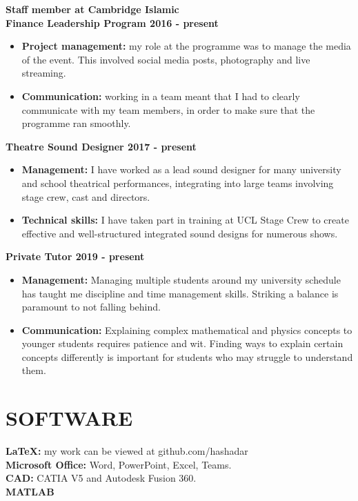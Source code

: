 \documentclass[margin, 10pt]{res} %
\begin{document}
\begin{resume}
\textbf{Staff member at Cambridge Islamic \\ Finance Leadership Program \hfill 2016 - present}
\\
\begin{itemize}
  \item \textbf{Project management:} my role at the programme was to manage the media of the event. This involved social media posts, photography and live streaming. 
  \item \textbf{Communication:} working in a team meant that I had to clearly communicate with my team members, in order to make sure that the programme ran smoothly.
\end{itemize}

\textbf{Theatre Sound Designer \hfill 2017 - present}
\\
\begin{itemize}
  \item \textbf{Management:} I have worked as a lead sound designer for many university and school theatrical performances, integrating into large teams involving stage crew, cast and directors.
  \item \textbf{Technical skills:} I have taken part in training at UCL Stage Crew to create effective and well-structured integrated sound designs for numerous shows.
\end{itemize}

\textbf{Private Tutor \hfill 2019 - present}
\\
\begin{itemize}
  \item \textbf{Management:} Managing multiple students around my university schedule has taught me discipline and time management skills. Striking a balance is paramount to not falling behind. 
  \item \textbf{Communication:} Explaining complex mathematical and physics concepts to \\ younger students requires patience and wit. Finding ways to explain certain concepts differently is important for students who may struggle to understand them.
\end{itemize}


\section{SOFTWARE}
\textbf{LaTeX:} my work can be viewed at github.com/hashadar\\
\textbf{Microsoft Office:} Word, PowerPoint, Excel, Teams.\\
\textbf{CAD:} CATIA V5 and Autodesk Fusion 360.\\
\textbf{MATLAB}\\


\end{resume}
\end{document}
